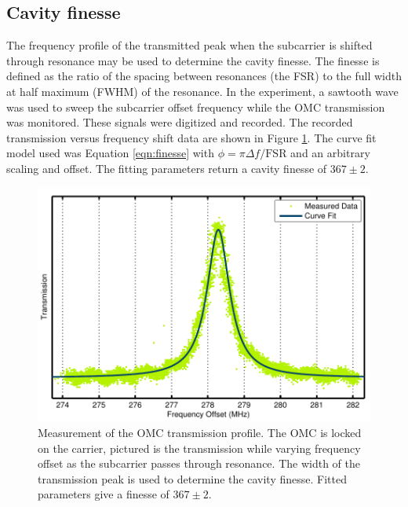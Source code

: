 \subsection{Cavity finesse}
\label{sec:finesse}
The frequency profile of the transmitted peak when the subcarrier is shifted through resonance may be used to determine the cavity finesse. %
The finesse is defined as the ratio of the spacing between resonances (the FSR) to the full width at half maximum (FWHM) of the resonance. %
In the experiment, a sawtooth wave was used to sweep the subcarrier offset frequency while the OMC transmission was monitored. %
These signals were digitized and recorded. %
The recorded transmission versus frequency shift data are shown in Figure \ref{fig:finesseFit}. %
The curve fit model used was Equation \ref{eqn:finesse} with $\phi=\pi \Delta f/\mathrm{FSR}$ and an arbitrary scaling and offset. %
The fitting parameters return a cavity finesse of $367\pm2$.
\begin{figure}
  \begin{center}
  \leavevmode
  \includegraphics{figs-omc/finesseFit.pdf}
  \end{center}
  \caption[Measurement of the OMC transmission profile.]{Measurement of the OMC transmission profile. The OMC is locked on the carrier, pictured is the transmission while varying frequency offset as the subcarrier passes through resonance. The width of the transmission peak is used to determine the cavity finesse. Fitted parameters give a finesse of $367\pm2$.}
  \label{fig:finesseFit}
\end{figure}

